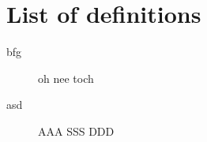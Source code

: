 \chapter*{List of definitions}
\begin{description}
\item[bfg]	oh nee toch
\item[asd]  AAA SSS DDD
\end{description}